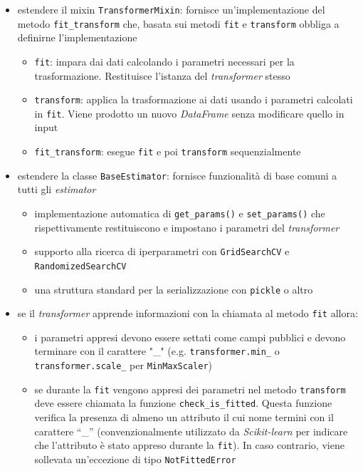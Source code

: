 \begin{itemize}
    \item estendere il mixin \texttt{TransformerMixin}: fornisce un'implementazione del metodo \texttt{fit\_transform} che, basata sui metodi \texttt{fit} e \texttt{transform} obbliga a definirne l'implementazione
    \begin{itemize}
        \item \texttt{fit}: impara dai dati calcolando i parametri necessari per la trasformazione. Restituisce l'istanza del \textit{transformer} stesso
        \item \texttt{transform}: applica la trasformazione ai dati usando i parametri calcolati in \texttt{fit}. Viene prodotto un nuovo \textit{DataFrame} senza modificare quello in input
        \item \texttt{fit\_transform}: esegue \texttt{fit} e poi \texttt{transform} sequenzialmente
    \end{itemize}
    \item estendere la classe \texttt{BaseEstimator}: fornisce funzionalità di base comuni a tutti gli \textit{estimator}
    \begin{itemize}
        \item implementazione automatica di \texttt{get\_params()} e \texttt{set\_params()} che rispettivamente restituiscono e impostano i parametri del \textit{transformer}
        \item supporto alla ricerca di iperparametri con \texttt{GridSearchCV} e \texttt{RandomizedSearchCV}
        \item una struttura standard per la serializzazione con \texttt{pickle} o altro
    \end{itemize}
    \item se il \textit{transformer} apprende informazioni con la chiamata al metodo \texttt{fit} allora:
    \begin{itemize}
        \item i parametri appresi devono essere settati come campi pubblici e devono terminare con il carattere "\_" (e.g. \texttt{transformer.min\_} o \\ \texttt{transformer.scale\_} per \texttt{MinMaxScaler})
        \item se durante la \texttt{fit} vengono appresi dei parametri nel metodo \texttt{transform} deve essere chiamata la funzione \texttt{check\_is\_fitted}. Questa funzione verifica la presenza di almeno un attributo il cui nome termini con il carattere ``\_'' (convenzionalmente utilizzato da \textit{Scikit-learn} per indicare che l'attributo è stato appreso durante la \texttt{fit}). In caso contrario, viene sollevata un'eccezione di tipo \texttt{NotFittedError}
    \end{itemize} 
\end{itemize}

